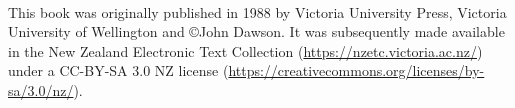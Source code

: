 \thispagestyle{empty}

~\vfill

This book was originally published in 1988 by Victoria University Press, Victoria University of Wellington and ©John Dawson.
It was subsequently made available in the New Zealand Electronic Text Collection (\url{https://nzetc.victoria.ac.nz/}) under a CC-BY-SA 3.0 NZ license (\url{https://creativecommons.org/licenses/by-sa/3.0/nz/}).
